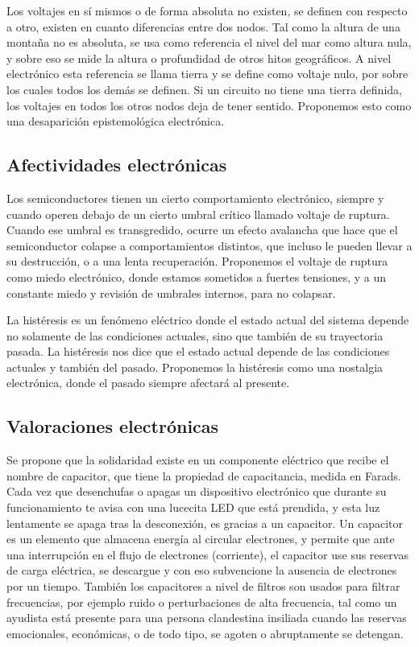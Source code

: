 \documentclass[./informes.tex]{subfiles}
\begin{document}
Los voltajes en sí mismos o de forma absoluta no existen, se definen con respecto a otro, existen en cuanto diferencias entre dos nodos. Tal como la altura de una montaña no es absoluta, se usa como referencia el nivel del mar como altura nula, y sobre eso se mide la altura o profundidad de otros hitos geográficos. A nivel electrónico esta referencia se llama tierra y se define como voltaje nulo, por sobre los cuales todos los demás se definen. Si un circuito no tiene una tierra definida, los voltajes en todos los otros nodos deja de tener sentido. Proponemos esto como una desaparición epistemológica electrónica.

\subsection{Afectividades electrónicas}

Los semiconductores tienen un cierto comportamiento electrónico, siempre y cuando operen debajo de un cierto umbral crítico llamado voltaje de ruptura. Cuando ese umbral es transgredido, ocurre un efecto avalancha que hace que el semiconductor colapse a comportamientos distintos, que incluso le pueden llevar a su destrucción, o a una lenta recuperación. Proponemos el voltaje de ruptura como miedo electrónico, donde estamos sometidos a fuertes tensiones, y a un constante miedo y revisión de umbrales internos, para no colapsar. 

La histéresis es un fenómeno eléctrico donde el estado actual del sistema depende no solamente de las condiciones actuales, sino que también de su trayectoria pasada. La histéresis nos dice que el estado actual depende de las condiciones actuales y también del pasado. Proponemos la histéresis como una nostalgia electrónica, donde el pasado siempre afectará al presente.

\subsection{Valoraciones electrónicas}

Se propone que la solidaridad existe en un componente eléctrico que recibe el nombre de capacitor, que tiene la propiedad de capacitancia, medida en Farads. Cada vez que desenchufas o apagas un dispositivo electrónico que durante su funcionamiento te avisa con una lucecita LED que está prendida, y esta luz lentamente se apaga tras la desconexión, es gracias a un capacitor. Un capacitor es un elemento que almacena energía al circular electrones, y permite que ante una interrupción en el flujo de electrones (corriente), el capacitor use sus reservas de carga eléctrica, se descargue y con eso subvencione la ausencia de electrones por un tiempo. También los capacitores a nivel de filtros son usados para filtrar frecuencias, por ejemplo ruido o perturbaciones de alta frecuencia, tal como un ayudista está presente para una persona clandestina insiliada cuando las reservas emocionales, económicas, o de todo tipo, se agoten o abruptamente se detengan.
\end{document}
